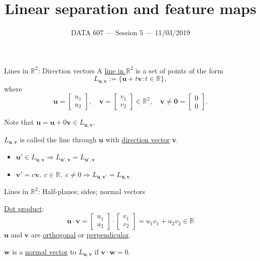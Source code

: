 \documentclass{beamer}
\newcommand{\vu}{\boldsymbol{u}}
\newcommand{\vv}{\boldsymbol{v}}
\newcommand{\vw}{\boldsymbol{w}}
\newcommand{\vzero}{\boldsymbol{0}}
\newcommand{\RR}{\mathbb{R}}
\begin{document}
\setlength{\parskip}{1em}
\begin{frame}
    \title{Linear separation and feature maps}
    \date{DATA 607 --- Session 5 --- 11/03/2019}
    \maketitle
\end{frame}

\begin{frame}{Lines in $\RR^2$: Direction vectors}
    A \underline{line in $\RR^2$} is a set of points of the form
    \[
        L_{\vu, \vv} := \{\vu + t\vv : t\in\RR\},
    \]
    where
    \[
        \vu=\begin{bmatrix}
            u_1\\u_2
        \end{bmatrix},\quad
        \vv=\begin{bmatrix}
            v_1\\v_2
        \end{bmatrix}\in\RR^2,\quad
        \vv\neq \vzero=\begin{bmatrix}
            0\\0
        \end{bmatrix}.
    \]

    Note that $\vu=\vu + 0\vv\in L_{\vu, \vv}$.

    $L_{\vu, \vv}$ is called the line through $\vu$ with \underline{direction vector} $\vv$.

    \begin{itemize}
        \item $\vu'\in L_{\vu, \vv} \Longrightarrow L_{\vu', \vv}=L_{\vu', \vv}$
        \item $\vv'=c\vv,\; c\in\RR,\; c\neq 0 \Longrightarrow L_{\vu, \vv'}=L_{\vu, \vv}$
    \end{itemize}
\end{frame}

\begin{frame}{Lines in $\RR^2$: Half-planes; sides; normal vectors}


    \underline{Dot product}:
    \[
        \vu\cdot\vv = \begin{bmatrix}
            u_1\\u_2
        \end{bmatrix}\cdot\begin{bmatrix}
            v_1\\v_2
        \end{bmatrix} = u_1 v_1 + u_2 v_2\in\RR
    \]
    $\vu$ and $\vv$ are \underline{orthogonal} or \underline{perpendicular}.

    $\vw$ is a \underline{normal vector} to $L_{\vu, \vv}$ if $\vv\cdot\vw = 0$.


\end{frame}
\end{document}
